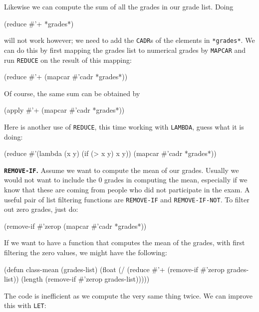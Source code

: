 \documentclass[a4paper,11pt]{article}
\begin{document}
\begin{uenum}
Likewise we can compute the sum of all the grades in our grade list. Doing

\begin{lispcode}
(reduce #'+ *grades*)
\end{lispcode}

will not work however; we need to add the \Verb+CADR+s of the elements in \Verb+*grades*+. We can do this by first mapping the grades list to numerical grades by \Verb+MAPCAR+ and run \Verb+REDUCE+ on the result of this mapping:

\begin{lispcode}
(reduce #'+ (mapcar #'cadr *grades*))
\end{lispcode}

Of course, the same sum can be obtained by

\begin{lispcode}
(apply #'+ (mapcar #'cadr *grades*))
\end{lispcode}

Here is another use of \Verb+REDUCE+, this time working with \Verb+LAMBDA+, guess what it is doing:

\begin{lispcode}
(reduce
     #'(lambda (x y) (if (> x y) x y))
	 (mapcar #'cadr *grades*))
\end{lispcode}

\item {\bf \Verb+REMOVE-IF+.} Assume we want to compute the mean of our grades. Usually we would not want to include the 0 grades in computing the mean, especially if we know that these are coming from people who did not participate in the exam. A useful pair of list filtering functions are \Verb+REMOVE-IF+ and \Verb+REMOVE-IF-NOT+. To filter out zero grades, just do:  

\begin{lispcode}
(remove-if #'zerop (mapcar #'cadr *grades*))
\end{lispcode}

If we want to have a function that computes the mean of the grades, with first filtering the zero values, we might have the following:

\begin{lispcode}
(defun class-mean (grades-list)
  (float (/
		   (reduce #'+ (remove-if #'zerop grades-list)) 
		   (length (remove-if #'zerop grades-list)))))
\end{lispcode}

The code is inefficient as we compute the very same thing twice. We can improve this with \Verb+LET+:


\end{uenum}
\end{document}
